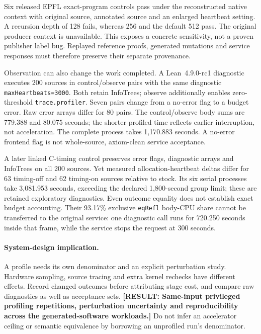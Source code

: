 \documentclass[10pt,twocolumn]{article}
\newcommand{\missing}[1]{\textbf{[RESULT: #1]}}
\begin{document}
Six released EPFL exact-program controls pass under the reconstructed
native context with original source, annotated source and an enlarged
heartbeat setting. A recursion depth of 128 fails, whereas 256 and the
default 512 pass. The original producer context is unavailable.
This exposes a concrete sensitivity, not a proven publisher label bug.
Replayed reference proofs, generated mutations and service responses must
therefore preserve their separate provenance.

Observation can also change the work completed.
A Lean~4.9.0-rc1 diagnostic executes 200 sources in control/observe pairs
with the same diagnostic \texttt{maxHeartbeats=3000}.
Both retain InfoTrees; observe additionally enables zero-threshold
\texttt{trace.profiler}. Seven pairs change from a no-error flag to a
budget error. Raw error arrays differ for 80 pairs.
The control/observe body sums are 779.388 and 80.075 seconds; the shorter
profiled time reflects earlier interruption, not acceleration.
The complete process takes 1,170.883 seconds.
A no-error frontend flag is not whole-source, axiom-clean service acceptance.

A later linked C-timing control preserves error flags, diagnostic arrays
and InfoTrees on all 200 sources. Yet measured allocation-heartbeat deltas
differ for 63 timing-off and 62 timing-on sources relative to stock.
Its six serial processes take 3,081.953 seconds, exceeding the declared
1,800-second group limit; these are retained exploratory diagnostics.
Even outcome equality does not establish exact budget accounting.
Their 93.17\% exclusive \texttt{eqRefl} body-CPU share cannot be transferred
to the original service: one diagnostic call runs for 720.250 seconds
inside that frame, while the service stops the request at 300 seconds.

\paragraph{System-design implication.}
A profile needs its own denominator and an explicit perturbation study.
Hardware sampling, source tracing and extra kernel rechecks have different
effects. Record changed outcomes before attributing stage cost, and compare
raw diagnostics as well as acceptance sets.
\missing{Same-input privileged profiling repetitions, perturbation
uncertainty and reproducibility across the generated-software workloads.}
Do not infer an accelerator ceiling or semantic equivalence by borrowing an
unprofiled run's denominator.
\end{document}
